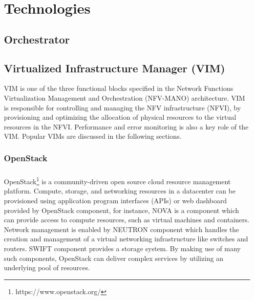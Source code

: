 \chapter{Technologies}
\label{ch:Technologies}

\section{Orchestrator}

\subsection{}
\subsection{}
\subsection{}
\subsection{}

\section{Virtualized Infrastructure Manager (VIM)}

VIM is one of the three functional blocks specified in the Network Functions Virtualization Management and Orchestration (NFV-MANO) architecture. VIM is responsible for controlling and managing the NFV infrastructure (NFVI), by provisioning and optimizing the allocation of physical resources to the virtual resources in the NFVI. Performance and error monitoring is also a key role of the VIM. Popular VIMs are discussed in the following sections.


\subsection{OpenStack}


\paragraph{}
OpenStack\footnote{https://www.openstack.org/} is a community-driven open source cloud resource management platform. Compute, storage, and networking resources in a datacenter can be provisioned using application program interfaces (APIs) or web dashboard provided by OpenStack component, for instance, NOVA is a component which can provide access to compute resources, such as virtual machines and containers. Network management is enabled by NEUTRON component which handles the creation and management of a virtual networking infrastructure like switches and routers. SWIFT component provides a storage system. By making use of many such components, OpenStack can deliver complex services by utilizing an underlying pool of resources.

